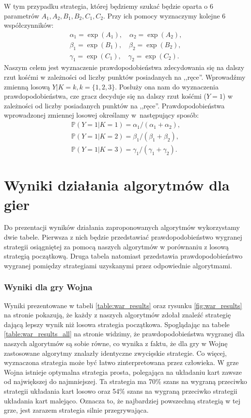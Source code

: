 \documentclass[inzynierska]{pwr_wmat_praca_dyplomowa}
\theoremstyle{plain}
\numberwithin{theorem}{chapter}
\theoremstyle{definition}
\numberwithin{theorem}{chapter}
\newcommand{\probP}{\mathbb{P}}
\begin{document}
	W tym przypadku strategia, której będziemy szukać będzie oparta o 6 parametrów $A_1, A_2, B_1, B_2, C_1, C_2$. Przy ich pomocy wyznaczymy kolejne 6 współczynników:
	\begin{align*}
		\alpha_1 = \exp(A_1),\quad
		\alpha_2 = \exp(A_2),\\ 
		\beta_1= \exp(B_1),\quad
		\beta_2= \exp(B_2), \\
		\gamma_1= \exp(C_1),\quad
		\gamma_2= \exp(C_2).
	\end{align*}
	Naszym celem jest wyznaczenie prawdopodobieństwa zdecydowania się na dalszy rzut kośćmi w zależności od liczby punktów posiadanych na ,,ręce''. Wprowadźmy zmienną losową $Y|K=k, k=\{1, 2, 3\}$. Posłuży ona  nam do wyznaczenia prawdopodobieństwa, cze gracz decyduje się na dalszy rzut kośćmi ($Y=1$) w zależności od liczby posiadanych punktów na ,,ręce''.  Prawdopodobieństwa wprowadzonej zmiennej losowej określamy w~następujący sposób:  
	\begin{gather*}
	 \probP(Y = 1|K=1) = \alpha_1/(\alpha_1+\alpha_2),\\
	 \probP(Y = 1|K=2) = \beta_1/(\beta_1+\beta_2),\\
	 \probP(Y = 1|K=3) = \gamma_1/(\gamma_1+\gamma_2). 
	\end{gather*}


	
	\chapter{Wyniki działania algorytmów dla gier}
	Do prezentacji wyników działania zaproponowanych algorytmów wykorzystamy dwie tabele.
	Pierwsza z nich będzie przedstawiać prawdopodobieństwo wygranej strategii osiągniętej za pomocą naszych algorytmów w porównaniu z losową strategią początkową.
	Druga tabela natomiast przedstawia prawdopodobieństwo wygranej pomiędzy strategiami uzyskanymi przez odpowiednie algorytmami.
	
	\subsection*{Wyniki dla gry Wojna}
	Wyniki prezentowane w tabeli \ref{table:war_results} oraz rysunku \ref{fig:war_results} na stronie \pageref{table:war_results} pokazują, że każdy z naszych algorytmów zdołał znaleźć strategię dającą lepszy wynik niż losowa strategia początkowa. Spoglądając na tabele \ref{table:war_results_all} na stronie \pageref{table:war_results_all} widzimy, że prawdopodobieństwa wygranej dla naszych algorytmów są sobie równe, co wynika z faktu, że dla gry w Wojnę zastosowane algorytmy znalazły identyczne zwycięskie strategie. Co więcej, wyznaczona strategia może być łatwo zinterpretowana przez człowieka. W grze Wojna istnieje optymalna strategia prosta, polegająca na układaniu kart zawsze od największej do najmniejszej. Ta strategia ma 70\% szans na wygraną przeciwko strategii układania kart losowo oraz 54\% szans na wygraną przeciwko strategii układania kart malejąco. Oznacza to, że najbardziej powszechną strategią w tej grze, jest zarazem strategia silnie przegrywająca.
	
\end{document}
